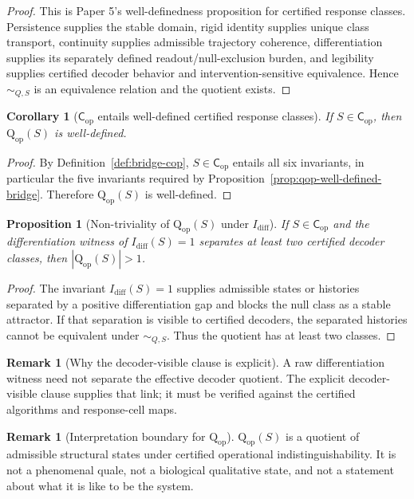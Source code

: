 \documentclass[11pt,a4paper]{article}
\newtheorem{proposition}[theorem]{Proposition}
\newtheorem{corollary}[theorem]{Corollary}
\theoremstyle{definition}
\newtheorem{remark}[theorem]{Remark}
\newcommand{\Cop}{\mathsf{C}_{\mathrm{op}}}
\newcommand{\Qop}{\mathrm{Q}_{\mathrm{op}}}
\newcommand{\Idiff}{I_{\mathrm{diff}}}
\begin{document}
\begin{proof}
This is Paper 5's well-definedness proposition for certified response classes. Persistence supplies the stable domain, rigid identity supplies unique class transport, continuity supplies admissible trajectory coherence, differentiation supplies its separately defined readout/null-exclusion burden, and legibility supplies certified decoder behavior and intervention-sensitive equivalence. Hence $\sim_{Q,S}$ is an equivalence relation and the quotient exists.
\end{proof}

\begin{corollary}[$\Cop$ entails well-defined certified response classes]\label{cor:cop-qop}
If $S\in\Cop$, then $\Qop(S)$ is well-defined.
\end{corollary}

\begin{proof}
By Definition~\ref{def:bridge-cop}, $S\in\Cop$ entails all six invariants, in particular the five invariants required by Proposition~\ref{prop:qop-well-defined-bridge}. Therefore $\Qop(S)$ is well-defined.
\end{proof}

\begin{proposition}[Non-triviality of $\Qop(S)$ under $\Idiff$]\label{prop:qop-nontrivial}
If $S\in\Cop$ and the differentiation witness of $\Idiff(S)=1$ separates at least two certified decoder classes, then $|\Qop(S)|>1$.
\end{proposition}

\begin{proof}
The invariant $\Idiff(S)=1$ supplies admissible states or histories separated by a positive differentiation gap and blocks the null class as a stable attractor. If that separation is visible to certified decoders, the separated histories cannot be equivalent under $\sim_{Q,S}$. Thus the quotient has at least two classes.
\end{proof}

\begin{remark}[Why the decoder-visible clause is explicit]
A raw differentiation witness need not separate the effective decoder quotient. The explicit decoder-visible clause supplies that link; it must be verified against the certified algorithms and response-cell maps.
\end{remark}

\begin{remark}[Interpretation boundary for $\Qop$]
$\Qop(S)$ is a quotient of admissible structural states under certified operational indistinguishability. It is not a phenomenal quale, not a biological qualitative state, and not a statement about what it is like to be the system.
\end{remark}
\end{document}

